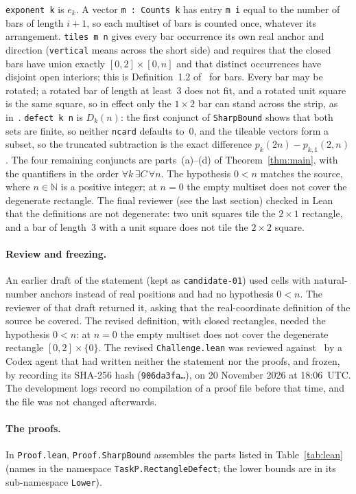 \documentclass[11pt]{article}
\theoremstyle{definition}
\theoremstyle{remark}
\begin{document}
{\texttt{exponent k} is $e_k$. A vector \texttt{m~:~Counts~k} has entry
\texttt{m i} equal to the number of bars of length $i+1$, so each multiset of
bars is counted once, whatever its arrangement. \texttt{tiles m n} gives every
bar occurrence its own real anchor and direction (\texttt{vertical} means
across the short side) and requires that the closed bars have union exactly
$[0,2]\times[0,n]$ and that distinct occurrences have disjoint open interiors;
this is Definition~1.2 of~\cite{gvz} for bars. Every bar may be rotated; a
rotated bar of length at least~$3$ does not fit, and a rotated unit square is
the same square, so in effect only the $1\times2$ bar can stand across the
strip, as in~\cite{gvz}. \texttt{defect k n} is $D_k(n)$: the first conjunct
of \texttt{SharpBound} shows that both sets are finite, so neither
\texttt{ncard} defaults to~$0$, and the tileable vectors form a subset, so the
truncated subtraction is the exact difference
$p_k(2n)-p_{k,1}(2,n)$. The four remaining conjuncts are parts~(a)--(d) of
Theorem~\ref{thm:main}, with the quantifiers in the order $\forall k\,\exists
C\,\forall n$. The hypothesis $0<n$ matches the source, where $n\in\mathbb N$
is a positive integer; at $n=0$ the empty multiset does not cover the
degenerate rectangle. The final reviewer (see the last section) checked in Lean
that the definitions are not degenerate: two unit squares tile the
$2\times1$ rectangle, and a bar of length~$3$ with a unit square does not tile
the $2\times2$ square.

\paragraph{Review and freezing.}
An earlier draft of the statement (kept as \texttt{candidate-01}) used cells
with natural-number anchors instead of real positions and had no hypothesis
$0<n$. The reviewer of that draft returned it, asking that the real-coordinate
definition of the source be covered. The revised definition, with closed
rectangles, needed the hypothesis $0<n$: at $n=0$ the empty multiset does not
cover the degenerate rectangle $[0,2]\times\{0\}$. The revised \texttt{Challenge.lean} was
reviewed against~\cite{gvz} by a Codex agent that had written neither the
statement nor the proofs, and frozen, by recording its SHA-256 hash
(\texttt{906da3fa\ldots}), on 20 November 2026 at 18:06~UTC. The development
logs record no compilation of a proof file before that time, and the file was
not changed afterwards.

\paragraph{The proofs.}
In \texttt{Proof.lean}, \texttt{Proof.SharpBound} assembles the parts listed
in Table~\ref{tab:lean} (names in the namespace \texttt{TaskP.RectangleDefect};
the lower bounds are in its sub-namespace \texttt{Lower}).

}
\end{document}

